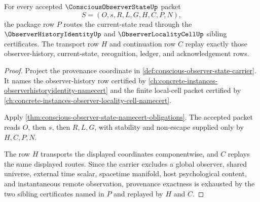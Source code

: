 \begin{theorem}
\label{thm:conscious-observer-state-locality-provenance-exactness}
For every accepted $\ConsciousObserverStateUp$ packet
$$
S=(O,s,R,L,G,H,C,P,N),
$$
the package row $P$ routes the current-state read through the $\ObserverHistoryIdentityUp$ and $\ObserverLocalityCellUp$ sibling certificates. The transport row $H$ and continuation row $C$ replay exactly those observer-history, current-state, recognition, ledger, and acknowledgement rows.
\end{theorem}
\begin{proof}
Project the provenance coordinate in \autoref{def:conscious-observer-state-carrier}. It names the observer-history row certified by \autoref{ch:concrete-instances-observerhistoryidentity-namecert} and the finite local-cell packet certified by \autoref{ch:concrete-instances-observer-locality-cell-namecert}.

Apply \autoref{thm:conscious-observer-state-namecert-obligations}. The accepted packet reads $O$, then $s$, then $R,L,G$, with stability and non-escape supplied only by $H,C,P,N$.

The row $H$ transports the displayed coordinates componentwise, and $C$ replays the same displayed routes. Since the carrier excludes a global observer, shared universe, external time scalar, spacetime manifold, host psychological content, and instantaneous remote observation, provenance exactness is exhausted by the two sibling certificates named in $P$ and replayed by $H$ and $C$.
\end{proof}

